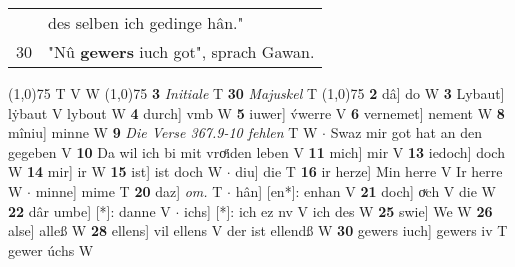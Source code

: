 \documentclass[8pt,a4paper,notitlepage]{article}
\begin{document}
\begin{table}[ht]
\begin{minipage}[t]{0.5\linewidth}
\begin{tabular}{rl}
 & des selben ich gedinge hân."\\ 
30 & "Nû \textbf{gewers} iuch got", sprach Gawan.\\ 
\end{tabular}
\scriptsize
\line(1,0){75} \newline
T V W \newline
\line(1,0){75} \newline
\textbf{3} \textit{Initiale} T  \textbf{30} \textit{Majuskel} T  \newline
\line(1,0){75} \newline
\textbf{2} dâ] do W \textbf{3} Lybaut] lẏbaut V lybout W \textbf{4} durch] vmb W \textbf{5} iuwer] v́werre V \textbf{6} vernemet] nement W \textbf{8} mîniu] minne W \textbf{9} \textit{Die Verse 367.9-10 fehlen} T W   $\cdot$ Swaz mir got hat an den gegeben V \textbf{10} Da wil ich bi mit vroͤiden leben V \textbf{11} mich] mir V \textbf{13} iedoch] doch W \textbf{14} mir] ir W \textbf{15} ist] ist doch W  $\cdot$ diu] die T \textbf{16} ir herze] Min herre V Ir herre W  $\cdot$ minne] mime T \textbf{20} daz] \textit{om.} T  $\cdot$ hân] [en*]: enhan V \textbf{21} doch] oͮch V die W \textbf{22} dâr umbe] [*]: danne V  $\cdot$ ichs] [*]: ich ez nv V ich des W \textbf{25} swie] We W \textbf{26} alse] alleß W \textbf{28} ellens] vil ellens V der ist ellendß W \textbf{30} gewers iuch] gewers iv T gewer úchs W \newline
\end{minipage}
\end{table}
\end{document}
